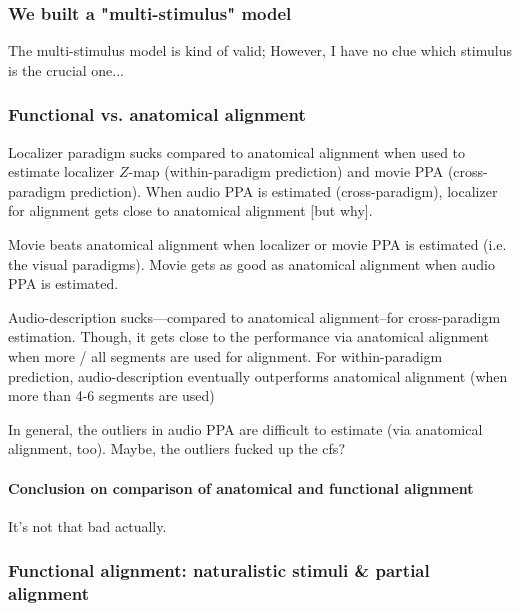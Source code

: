\subsubsection{We built a "multi-stimulus" model}



The multi-stimulus model is kind of valid;
%
However, I have no clue which stimulus is the crucial one...


\subsubsection{Functional vs. anatomical alignment}

Localizer paradigm sucks compared to anatomical alignment when used to estimate
localizer $Z$-map (within-paradigm prediction) and movie PPA (cross-paradigm
prediction).
%
When audio PPA is estimated (cross-paradigm), localizer for alignment gets close
to anatomical alignment [but why].

%
Movie beats anatomical alignment when localizer or movie PPA is estimated (i.e.
the visual paradigms).
%
Movie gets as good as anatomical alignment when audio PPA is estimated.

%
Audio-description sucks---compared to anatomical alignment--for cross-paradigm
estimation.
%
Though, it gets close to the performance via anatomical alignment when more /
all segments are used for alignment.
%
For within-paradigm prediction, audio-description eventually outperforms
anatomical alignment (when more than 4-6 segments are used)
%

%
In general, the outliers in audio PPA are difficult to estimate (via anatomical
alignment, too).
%
Maybe, the outliers fucked up the \ac{cfs}?


\paragraph{Conclusion on comparison of anatomical and functional alignment}

It's not that bad actually.


\subsubsection{Functional alignment: naturalistic stimuli \& partial alignment}

